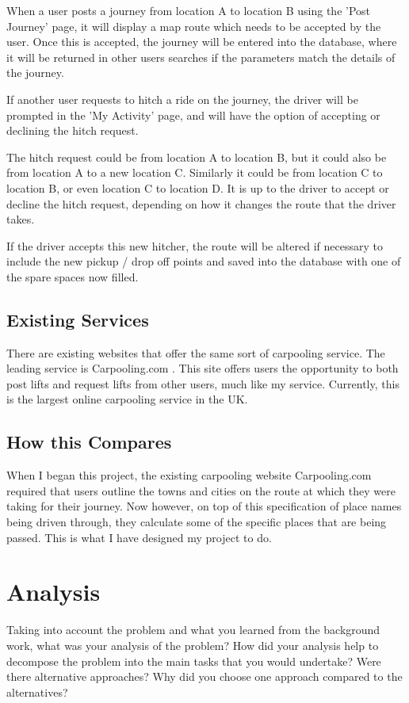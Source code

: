 	When a user posts a journey from location A to location B using the 'Post Journey' page, it will display a map route which needs to be accepted by the user. Once this is accepted, the journey will be entered into the database, where it will be returned in other users searches if the parameters match the details of the journey.
	
	If another user requests to hitch a ride on the journey, the driver will be prompted in the 'My Activity' page, and will have the option of accepting or declining the hitch request. 
	
	The hitch request could be from location A to location B, but it could also be from location A to a new location C. Similarly it could be from location C to location B, or even location C to location D. It is up to the driver to accept or decline the hitch request, depending on how it changes the route that the driver takes.
	
	If the driver accepts this new hitcher, the route will be altered if necessary to include the new pickup / drop off points and saved into the database with one of the spare spaces now filled. 
\subsection{Existing Services}
	There are existing websites that offer the same sort of carpooling service. The leading service is Carpooling.com \cite{carpooling_com}. This site offers users the opportunity to both post lifts and request lifts from other users, much like my service. Currently, this is the largest online carpooling service in the UK.
	
\subsection{How this Compares}
	When I began this project, the existing carpooling website Carpooling.com required that users outline the towns and cities on the route at which they were taking for their journey. Now however, on top of this specification of place names being driven through, they calculate some of the specific places that are being passed. This is what I have designed my project to do.

\section{Analysis}
Taking into account the problem and what you learned from the background work, what was your analysis of the problem? How did your analysis help to decompose the problem into the main tasks that you would undertake? Were there alternative approaches? Why did you choose one approach compared to the alternatives? 

